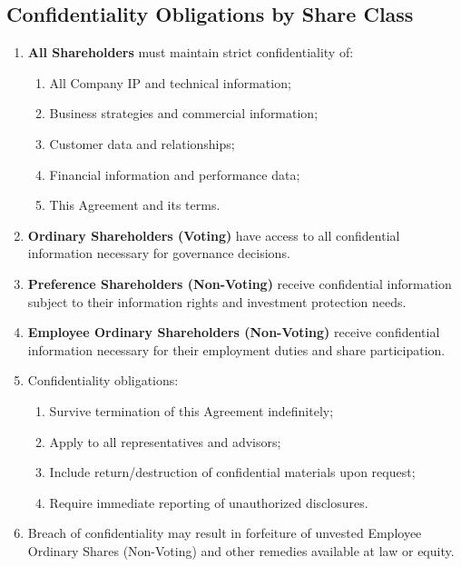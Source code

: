 \subsection{Confidentiality Obligations by Share Class}
\begin{enumerate}[label=(\alph*)]
\item \textbf{All Shareholders} must maintain strict confidentiality of:
    \begin{enumerate}[label=(\roman*)]
    \item All Company IP and technical information;
    \item Business strategies and commercial information;
    \item Customer data and relationships;
    \item Financial information and performance data;
    \item This Agreement and its terms.
    \end{enumerate}

\item \textbf{Ordinary Shareholders (Voting)} have access to all confidential information necessary for governance decisions.

\item \textbf{Preference Shareholders (Non-Voting)} receive confidential information subject to their information rights and investment protection needs.

\item \textbf{Employee Ordinary Shareholders (Non-Voting)} receive confidential information necessary for their employment duties and share participation.

\item Confidentiality obligations:
    \begin{enumerate}[label=(\roman*)]
    \item Survive termination of this Agreement indefinitely;
    \item Apply to all representatives and advisors;
    \item Include return/destruction of confidential materials upon request;
    \item Require immediate reporting of unauthorized disclosures.
    \end{enumerate}

\item Breach of confidentiality may result in forfeiture of unvested Employee Ordinary Shares (Non-Voting) and other remedies available at law or equity.
\end{enumerate}

